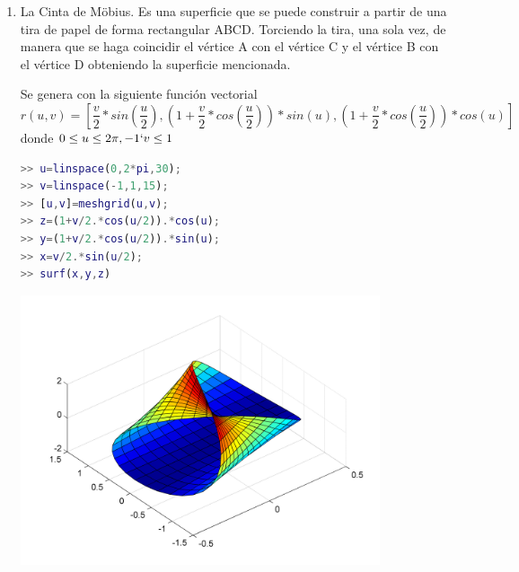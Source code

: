 \begin{enumerate}
\item La Cinta de Möbius. Es una superficie que se puede construir a partir de una tira de papel de forma rectangular ABCD. Torciendo la tira, una sola vez, de manera que se haga 
coincidir el vértice A con el vértice C y el vértice B con el vértice D obteniendo la 
superficie mencionada.

Se genera con la siguiente función vectorial 
$$r(u,v) = [\dfrac{v}{2}*sin(\frac{u}{2}),(1 + \dfrac{v}{2}*cos(\frac{u}{2}))*sin(u),(1 + \dfrac{v}{2}*cos(\frac{u}{2}))*cos(u)]$$ donde $0 \leq u \leq 2\pi ,-1 \lq v \leq 1$

\begin{lstlisting}[language=Matlab]
>> u=linspace(0,2*pi,30);
>> v=linspace(-1,1,15);
>> [u,v]=meshgrid(u,v);
>> z=(1+v/2.*cos(u/2)).*cos(u);
>> y=(1+v/2.*cos(u/2)).*sin(u);
>> x=v/2.*sin(u/2);
>> surf(x,y,z)
\end{lstlisting}
\includegraphics[width=300pt]{./Imagenes/cinta.png}

\end{enumerate}